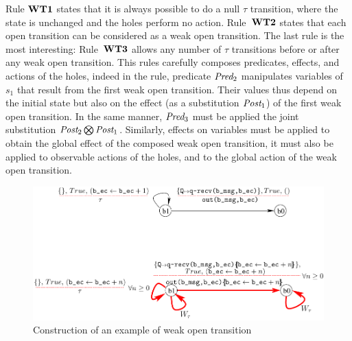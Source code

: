 \documentclass{lmcs}
\begin{document}
Rule $\textbf{WT1}$ states that it is always possible to do a null $\tau$ transition, where the state is unchanged and the holes perform no action. Rule~$\textbf{WT2}$ states that each open transition can be considered as a weak open transition. The last rule is the most interesting:  Rule~$\textbf{WT3}$ allows any number of $\tau$ transitions before or after any weak open transition. This rules carefully composes predicates, effects, and actions of the holes, indeed in the rule, predicate $\Pred_2$ manipulates variables of $s_1$ that result from the first weak open transition. Their values thus depend on the initial state but also on the effect (as a substitution $\Post_1$) of the first weak open transition. In the same manner, $\Pred_3$ must be applied the joint substitution $\Post_2\bigotimes\Post_1$. Similarly, effects on variables must be applied to obtain the global effect of the composed weak open transition, it must also be applied to observable actions of the holes, and to the global action of the weak open transition.



\begin{figure}[ht]
   \centerline{\includegraphics[width=13cm]{XFIG/WOT2-result}}
  \caption{Construction of an example of weak open transition}
   \label{WOT2}
\end{figure}
\end{document}
